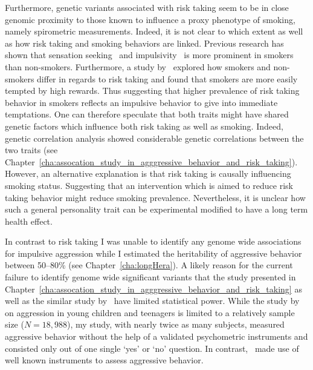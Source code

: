 Furthermore, genetic variants associated with risk taking seem to be in close genomic proximity to those known to influence a proxy phenotype of smoking, namely spirometric measurements.
Indeed, it is not clear to which extent as well as how risk taking and smoking behaviors are linked.
Previous research has shown that sensation seeking~\cite{Carton1994} and impulsivity~\cite{Glicksohn2007,Mitchell1999} is more prominent in smokers than non-smokers.
Furthermore, a study by~\citet{Ert2013} explored how smokers and non-smokers differ in regards to risk taking and found that smokers are more easily tempted by high rewards.
Thus suggesting that higher prevalence of risk taking behavior in smokers reflects an impulsive behavior to give into immediate temptations. 
One can therefore speculate that both traits might have shared genetic factors which influence both risk taking as well as smoking.
Indeed, genetic correlation analysis showed considerable genetic correlations between the two traits (see Chapter~\ref{cha:assocation_study_in_agggressive_behavior_and_risk_taking}).
However, an alternative explanation is that risk taking is causally influencing smoking status.
Suggesting that an intervention which is aimed to reduce risk taking behavior might reduce smoking prevalence. 
Nevertheless, it is unclear how such a general personality trait can be experimental modified to have a long term health effect.

In contrast to risk taking I was unable to identify any genome wide associations for impulsive aggression while I estimated the heritability of aggressive behavior between 50--80\% (see Chapter~\ref{cha:longHera}).
A likely reason for the current failure to identify genome wide significant variants that the study presented in Chapter~\ref{cha:assocation_study_in_agggressive_behavior_and_risk_taking} as well as the similar study by~\citet{Pappa2016a} have limited statistical power.
While the study by~\cite{Pappa2016a} on aggression in young children and teenagers is limited to a relatively sample size ($N=18,988$),
my study, with nearly twice as many subjects, measured aggressive behavior without the help of a validated psychometric instruments and consisted only out of one single `yes' or `no' question. 
In contrast,~\citet{Pappa2016a} made use of well known instruments to assess aggressive behavior.

